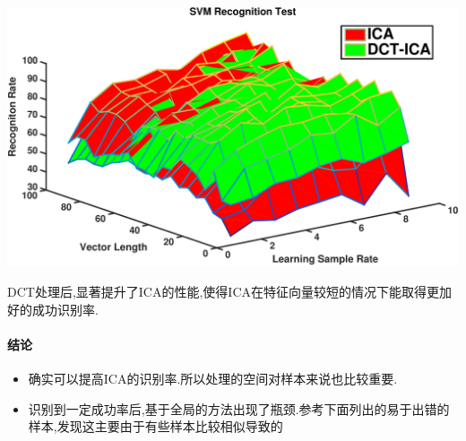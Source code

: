 	\begin{center}
	\begin{minipage}[t]{\linewidth}
	\center
	{
	\includegraphics[width=\textwidth]{Img/svm_ica_dct} 
	}
	\end{minipage}
	\medskip
	\end{center}
	DCT处理后,显著提升了ICA的性能,使得ICA在特征向量较短的情况下能取得更加好的成功识别率.
	
	\paragraph{结论}
	\begin{itemize}
		\item 确实可以提高ICA的识别率.所以处理的空间对样本来说也比较重要.
		\item 识别到一定成功率后,基于全局的方法出现了瓶颈.参考下面列出的易于出错的样本,发现这主要由于有些样本比较相似导致的
	\end{itemize}
